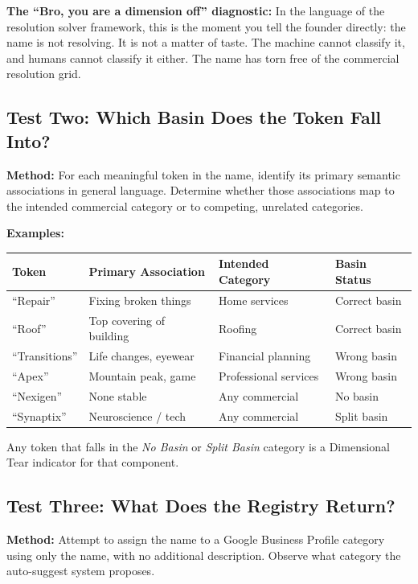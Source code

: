 \documentclass[12pt, openany]{book}
\theoremstyle{thmstyle}
\theoremstyle{defstyle}
\begin{document}
\textbf{The ``Bro, you are a dimension off'' diagnostic:} In the language of the resolution solver framework, this is the moment you tell the founder directly: the name is not resolving. It is not a matter of taste. The machine cannot classify it, and humans cannot classify it either. The name has torn free of the commercial resolution grid.

\subsection{Test Two: Which Basin Does the Token Fall Into?}

\textbf{Method:} For each meaningful token in the name, identify its primary semantic associations in general language. Determine whether those associations map to the intended commercial category or to competing, unrelated categories.

\textbf{Examples:}

\begin{center}
\begin{tabular}{llll}
\toprule
\textbf{Token} & \textbf{Primary Association} & \textbf{Intended Category} & \textbf{Basin Status} \\
\midrule
``Repair'' & Fixing broken things & Home services & Correct basin \\
``Roof'' & Top covering of building & Roofing & Correct basin \\
``Transitions'' & Life changes, eyewear & Financial planning & Wrong basin \\
``Apex'' & Mountain peak, game & Professional services & Wrong basin \\
``Nexigen'' & None stable & Any commercial & No basin \\
``Synaptix'' & Neuroscience / tech & Any commercial & Split basin \\
\bottomrule
\end{tabular}
\end{center}

Any token that falls in the \textit{No Basin} or \textit{Split Basin} category is a Dimensional Tear indicator for that component.

\subsection{Test Three: What Does the Registry Return?}

\textbf{Method:} Attempt to assign the name to a Google Business Profile category using only the name, with no additional description. Observe what category the auto-suggest system proposes.
\end{document}
